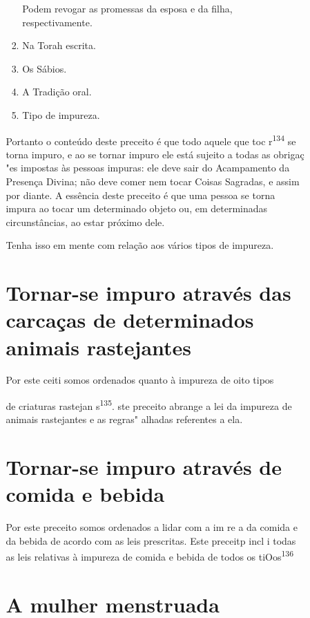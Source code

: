 \begin{itemize}
\begin{enumrate}
\begin{itemize}
\begin{itemize}
\begin{enumerate}
 Podem revogar as promessas da esposa e da filha, respectivamente.
 
\item
 
 Na Torah escrita.
 
\item
 
 Os Sábios.
 
\item
 
 A Tradição oral.
 
\item
 
 Tipo de impureza.
 
\end{enumerate}
Portanto o conteúdo deste preceito é que todo aquele que toc
r\textsuperscript{134} se torna impuro, e ao se tornar impuro ele está
sujeito a todas as obrigaç "es impostas às pessoas impuras: ele deve
sair do Acampamento da Presença Divi­na; não deve comer nem tocar Coisas
Sagradas, e assim por diante. A essência deste preceito é que uma pessoa
se torna impura ao tocar um determinado ob­jeto ou, em determinadas
circunstâncias, ao estar próximo dele.

Tenha isso em mente com relação aos vários tipos de impureza.


\section{Tornar-se impuro através das carcaças de determinados animais rastejantes}

Por este ceiti somos ordenados quanto à impureza de oito tipos


de criaturas rastejan s\textsuperscript{135}. ste preceito abrange a lei
da impureza de animais rastejantes e as regras" alhadas referentes a
ela.

\section{Tornar-se impuro através de comida e bebida}

Por este preceito somos ordenados a lidar com a im re a da comi­da e da
bebida de acordo com as leis prescritas. Este preceitp incl i todas as
leis relativas à impureza de comida e bebida de todos os
tiOos\textsuperscript{136}

\section{A mulher menstruada}


\end{itemize}
\end{itemize}
\end{enumrate}
\end{itemize}
